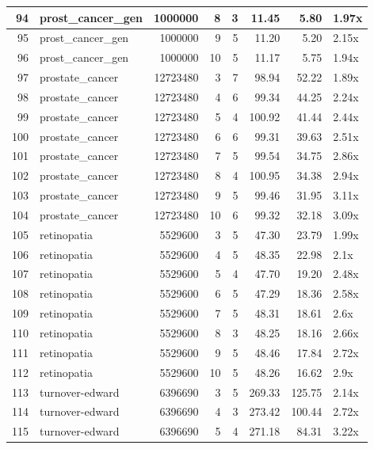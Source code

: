 \begin{table}[ht]
\begin{tabular}{rlrrrrrl}
   \hline
94 & prost\_cancer\_gen & 1000000 &   8 &   3 & 11.45 & 5.80 & 1.97x \\ 
   \hline
95 & prost\_cancer\_gen & 1000000 &   9 &   5 & 11.20 & 5.20 & 2.15x \\ 
   \hline
96 & prost\_cancer\_gen & 1000000 &  10 &   5 & 11.17 & 5.75 & 1.94x \\ 
   \hline
97 & prostate\_cancer & 12723480 &   3 &   7 & 98.94 & 52.22 & 1.89x \\ 
   \hline
98 & prostate\_cancer & 12723480 &   4 &   6 & 99.34 & 44.25 & 2.24x \\ 
   \hline
99 & prostate\_cancer & 12723480 &   5 &   4 & 100.92 & 41.44 & 2.44x \\ 
   \hline
100 & prostate\_cancer & 12723480 &   6 &   6 & 99.31 & 39.63 & 2.51x \\ 
   \hline
101 & prostate\_cancer & 12723480 &   7 &   5 & 99.54 & 34.75 & 2.86x \\ 
   \hline
102 & prostate\_cancer & 12723480 &   8 &   4 & 100.95 & 34.38 & 2.94x \\ 
   \hline
103 & prostate\_cancer & 12723480 &   9 &   5 & 99.46 & 31.95 & 3.11x \\ 
   \hline
104 & prostate\_cancer & 12723480 &  10 &   6 & 99.32 & 32.18 & 3.09x \\ 
   \hline
105 & retinopatia & 5529600 &   3 &   5 & 47.30 & 23.79 & 1.99x \\ 
   \hline
106 & retinopatia & 5529600 &   4 &   5 & 48.35 & 22.98 & 2.1x \\ 
   \hline
107 & retinopatia & 5529600 &   5 &   4 & 47.70 & 19.20 & 2.48x \\ 
   \hline
108 & retinopatia & 5529600 &   6 &   5 & 47.29 & 18.36 & 2.58x \\ 
   \hline
109 & retinopatia & 5529600 &   7 &   5 & 48.31 & 18.61 & 2.6x \\ 
   \hline
110 & retinopatia & 5529600 &   8 &   3 & 48.25 & 18.16 & 2.66x \\ 
   \hline
111 & retinopatia & 5529600 &   9 &   5 & 48.46 & 17.84 & 2.72x \\ 
   \hline
112 & retinopatia & 5529600 &  10 &   5 & 48.26 & 16.62 & 2.9x \\ 
   \hline
113 & turnover-edward & 6396690 &   3 &   5 & 269.33 & 125.75 & 2.14x \\ 
   \hline
114 & turnover-edward & 6396690 &   4 &   3 & 273.42 & 100.44 & 2.72x \\ 
   \hline
115 & turnover-edward & 6396690 &   5 &   4 & 271.18 & 84.31 & 3.22x \\ 

\end{tabular}
\end{table}
